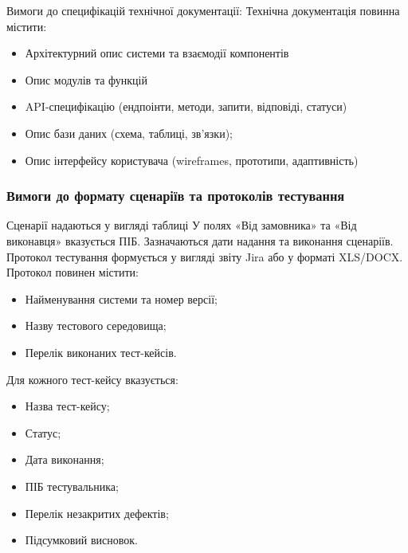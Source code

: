 \documentclass{article}
\begin{document}
Вимоги до специфікацій технічної документації:
Технічна документація повинна містити:

\begin{itemize}
    \item Архітектурний опис системи та взаємодії компонентів
    \item Опис модулів та функцій
    \item API-специфікацію (ендпоінти, методи, запити, відповіді, статуси)
    \item Опис бази даних (схема, таблиці, зв’язки);
    \item Опис інтерфейсу користувача (wireframes, прототипи, адаптивність)
\end{itemize}

\subsubsection{Вимоги до формату сценаріїв та протоколів тестування}

Сценарії надаються у вигляді таблиці У полях «Від замовника» та «Від виконавця» вказується ПІБ.
Зазначаються дати надання та виконання сценаріїв.
Протокол тестування формується у вигляді звіту Jira або у форматі XLS/DOCX.
Протокол повинен містити:

\begin{itemize}
    \item Найменування системи та номер версії;
    \item Назву тестового середовища;
    \item Перелік виконаних тест-кейсів.
\end{itemize}

Для кожного тест-кейсу вказується:

\begin{itemize}
    \item Назва тест-кейсу;
    \item Статус;
    \item Дата виконання;
    \item ПІБ тестувальника;
    \item Перелік незакритих дефектів;
    \item Підсумковий висновок.
\end{itemize}
\end{document}
